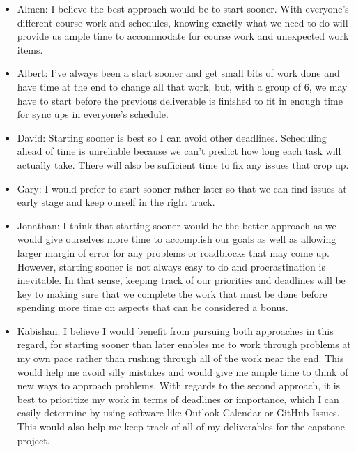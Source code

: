 \documentclass[12pt,letterpaper]{article}
\begin{document}
\begin{itemize}
    \item Almen: I believe the best approach would be to start sooner. With
    everyone's different course work and schedules, knowing exactly what we need
    to do will provide us ample time to accommodate for course work and
    unexpected work items.
    \item Albert: I've always been a start sooner and get small bits of work
    done and have time at the end to change all that work, but, with a group of
    6, we may have to start before the previous deliverable is finished to fit
    in enough time for sync ups in everyone's schedule.
    \item David: Starting sooner is best so I can avoid other deadlines.
    Scheduling ahead of time is unreliable because we can't predict how long
    each task will actually take. There will also be sufficient time to fix any
    issues that crop up.
    \item Gary: I would prefer to start sooner rather later so that we can find
    issues at early stage and keep ourself in the right track.
    \item Jonathan: I think that starting sooner would be the better approach as
    we would give ourselves more time to accomplish our goals as well as
    allowing larger margin of error for any problems or roadblocks that may come
    up. However, starting sooner is not always easy to do and procrastination is
    inevitable. In that sense, keeping track of our priorities and deadlines
    will be key to making sure that we complete the work that must be done
    before spending more time on aspects that can be considered a bonus.
    \item Kabishan: I believe I would benefit from pursuing both approaches in
    this regard, for starting sooner than later enables me to work through
    problems at my own pace rather than rushing through all of the work near the
    end. This would help me avoid silly mistakes and would give me ample time to
    think of new ways to approach problems. With regards to the second approach,
    it is best to prioritize my work in terms of deadlines or importance, which
    I can easily determine by using software like Outlook Calendar or GitHub
    Issues. This would also help me keep track of all of my deliverables for the
    capstone project.
\end{itemize}
\end{document}
